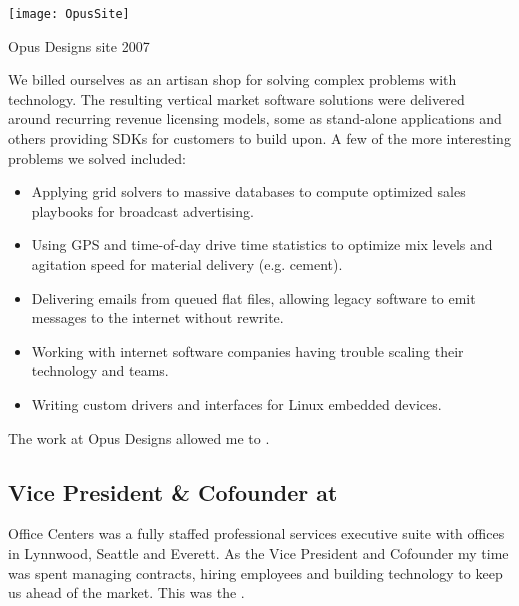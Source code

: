 \begin{marginfigure}%
  \texttt{[image: OpusSite]}
  \caption{Opus Designs site 2007}
  \label{fig:OpusSite}
\end{marginfigure}
We billed ourselves as an artisan shop for solving complex problems with technology.  The resulting vertical market software solutions were delivered around recurring revenue licensing models, some as stand-alone applications and others providing SDKs for customers to build upon.  A few of the more interesting problems we solved included:
\begin{itemize}
\itemsep-0.5em
\item{Applying grid solvers to massive databases to compute optimized sales playbooks for broadcast advertising.}
\item{Using GPS and time-of-day drive time statistics to optimize mix levels and agitation speed for material delivery (e.g. cement).}
\item{Delivering emails from queued flat files, allowing legacy software to emit messages to the internet without rewrite.}
\item{Working with internet software companies having trouble scaling their technology and teams.}
\item{Writing custom drivers and interfaces for Linux embedded devices.}
\end{itemize}

The work at Opus Designs allowed me to .

\subsection{\textbf{Vice President \& Cofounder} at  \shyears{[1995-1999]}}
Office Centers was a fully staffed professional services executive suite with offices in Lynnwood, Seattle and Everett.  As the Vice President and Cofounder my time was spent managing contracts, hiring employees and building technology to keep us ahead of the market.  This was the .

